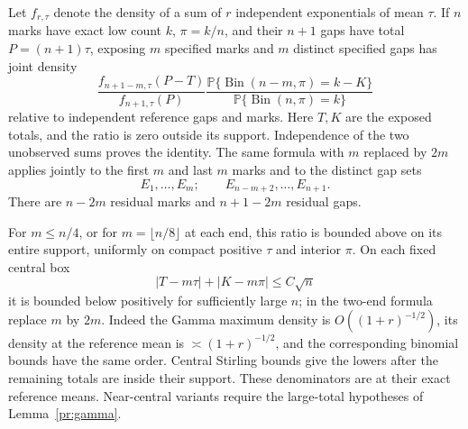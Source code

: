 Let $f_{r,\tau}$ denote the density of a sum of $r$ independent
exponentials of mean $\tau$. If $n$ marks have exact low count $k$,
$\pi=k/n$, and their $n+1$ gaps have total $P=(n+1)\tau$, exposing
$m$ specified marks and $m$ distinct specified gaps has joint density
\begin{equation}
 \frac{f_{n+1-m,\tau}(P-T)}{f_{n+1,\tau}(P)}
 \frac{\mathbb P\{\operatorname{Bin}(n-m,\pi)=k-K\}}
      {\mathbb P\{\operatorname{Bin}(n,\pi)=k\}}
 \label{bridge:prefix-density}
\end{equation}
relative to independent reference gaps and marks. Here $T,K$ are the
exposed totals, and the ratio is zero outside its support. Independence
of the two unobserved sums proves the identity. The same formula
with $m$ replaced by $2m$ applies jointly to the first $m$ and last $m$
marks and to the distinct gap sets
\[
 E_1,\ldots,E_m;\qquad E_{n-m+2},\ldots,E_{n+1}.
\]
There are $n-2m$ residual marks and $n+1-2m$ residual gaps.

For $m\le n/4$, or for $m=\lfloor n/8\rfloor$ at each end, this
ratio is bounded above on its entire support, uniformly on compact
positive $\tau$ and interior $\pi$. On each fixed central box
\[
 |T-m\tau|+|K-m\pi|\le C\sqrt n
\]
it is bounded below positively for sufficiently large $n$; in the
two-end formula replace $m$ by $2m$. Indeed the Gamma maximum density
is $O((1+r)^{-1/2})$, its density at the reference mean is
$\asymp(1+r)^{-1/2}$, and the corresponding binomial bounds have
the same order. Central Stirling bounds give the lowers after the
remaining totals are inside their support. These denominators are
at their exact reference means. Near-central variants require the
large-total hypotheses of Lemma~\ref{pr:gamma}.

